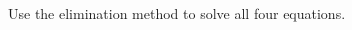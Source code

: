 \documentclass[12pt, a4paper, addpoints]{exam}
\newcommand{\elimination}[6]{%
    \pgfmathsetmacro{\cval}{#3*#1 + #4*#2} %
    \pgfmathsetmacro{\pval}{#5*#1 + #6*#2} %

    \def\formata{%
        \ifnum#3=1
            x
        \else\ifnum#3=-1
            -x
        \else
            \pgfmathprintnumber{#3}x
        \fi\fi}

    \def\formatb{%
        \ifnum#4=1
            +y
        \else\ifnum#4=-1
            -y
        \else
            \ifnum#4<0 \pgfmathprintnumber{#4}y \else +\pgfmathprintnumber{#4}y \fi
        \fi\fi}

    \def\formatd{%
        \ifnum#5=1
            x
        \else\ifnum#5=-1
            -x
        \else
            \pgfmathprintnumber{#5}x
        \fi\fi}

    \def\formate{%
        \ifnum#6=1
            +y
        \else\ifnum#6=-1
            -y
        \else
            \ifnum#6<0 \pgfmathprintnumber{#6}y \else +\pgfmathprintnumber{#6}y \fi
        \fi\fi}

    \[
    \begin{aligned}
    \formata \formatb &= \pgfmathprintnumber{\cval} \\[-1pt]
    \formatd \formate &= \pgfmathprintnumber{\pval}
    \end{aligned}
    \]
}
\begin{document}
\large
\begin{questions}
\question Use the elimination method to solve all four equations.
\begin{multicols}{2} 
\end{multicols}
\end{questions}
\end{document}
